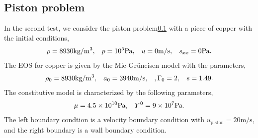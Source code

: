 \documentclass{article}
\numberwithin{equation}{section}
\numberwithin{table}{section}
\begin{document}
\subsection{Piston problem} 
In the second test, we consider the  piston problem\ref{} with a piece of copper with the initial conditions, 
\begin{equation}
  \rho = 8930 \text{kg}/\text{m}^3, \hspace{0.3cm}  p = 10^5 \text{Pa}, \hspace{0.3cm}  u = 0 \text{m}/\text{s},\hspace{0.3cm}  s_{xx} = 0 \text{Pa}.
\end{equation}
The EOS for copper is given by  the Mie-Gr\"uneisen model with the parameters,
\begin{equation}
  \rho_0 = 8930 \text{kg}/\text{m}^3, \hspace{0.3cm} a_0 = 3940\text{m}/\text{s}, \hspace{0.3cm}, \Gamma_0 = 2,\hspace{0.3cm} s = 1.49.
\end{equation}
The constitutive model is characterized by the following parameters,
\begin{equation}
  \mu = 4.5\times 10^{10}\text{Pa}, \hspace{0.3cm} Y^0 = 9\times 10^7 \text{Pa}.
\end{equation}
The left boundary condtion is a velocity boundary condition with $u_{\text{piston}} = 20 \text{m}/\text{s}$, and the right boundary is  a  wall boundary condition.
\end{document}
